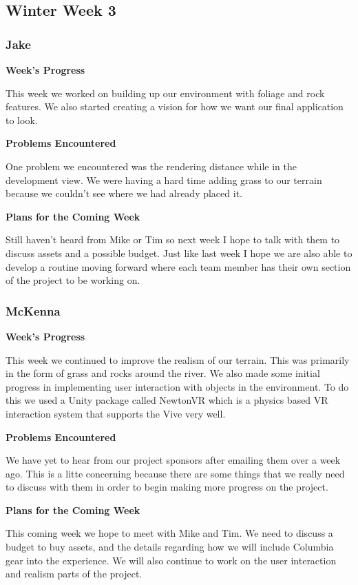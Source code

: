 \documentclass[10pt,journal,compsoc,onecolumn, draftclsnofoot]{IEEEtran}
\begin{document}
\subsection{Winter Week 3}
\subsubsection{Jake}
\noindent \textbf{Week's Progress}

This week we worked on building up our environment with foliage and rock features. We also started creating a vision for how we want our final application to look.

\noindent \textbf{Problems Encountered}

One problem we encountered was the rendering distance while in the development view. We were having a hard time adding grass to our terrain because we couldn't see where we had already placed it.

\noindent \textbf{Plans for the Coming Week}

Still haven't heard from Mike or Tim so next week I hope to talk with them to discuss assets and a possible budget. Just like last week I hope we are also able to develop a routine moving forward where each team member has their own section of the project to be working on.

\subsubsection{McKenna}
\noindent \textbf{Week's Progress}

This week we continued to improve the realism of our terrain. This was primarily in the form of grass and rocks around the river. We also made some initial progress in implementing user interaction with objects in the environment. To do this we used a Unity package called NewtonVR which is a physics based VR interaction system that supports the Vive very well.

\noindent \textbf{Problems Encountered}

We have yet to hear from our project sponsors after emailing them over a week ago. This is a litte concerning because there are some things that we really need to discuss with them in order to begin making more progress on the project.

\noindent \textbf{Plans for the Coming Week}

This coming week we hope to meet with Mike and Tim. We need to discuss a budget to buy assets, and the details regarding how we will include Columbia gear into the experience. We will also continue to work on the user interaction and realism parts of the project.
\end{document}
